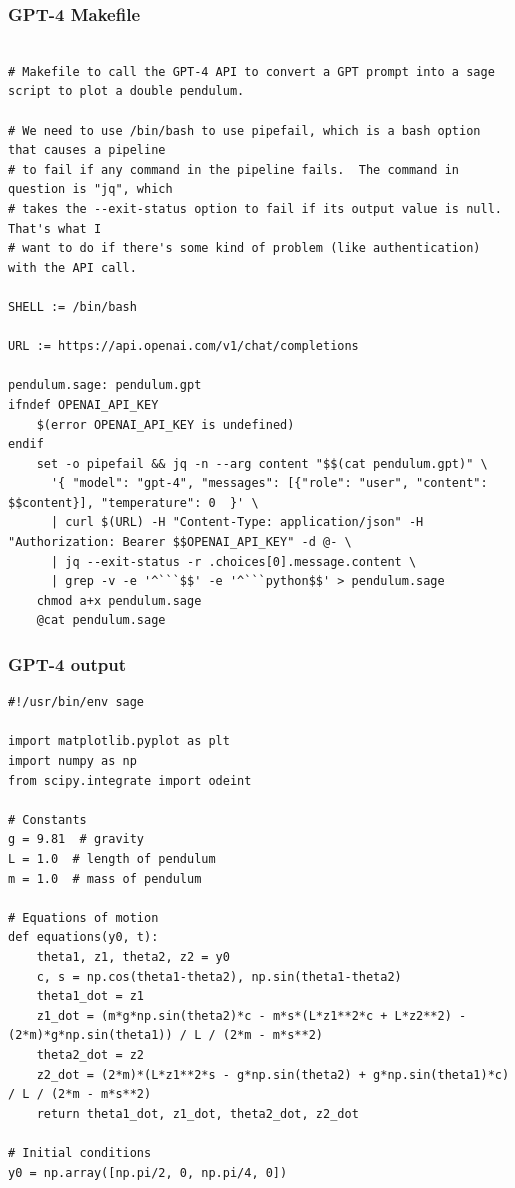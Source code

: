 \documentclass{beamer}
\begin{document}
\begin{frame}[fragile]
\frametitle{GPT-4 Makefile}
\begin{Verbatim}[fontsize=\tiny]

# Makefile to call the GPT-4 API to convert a GPT prompt into a sage script to plot a double pendulum.

# We need to use /bin/bash to use pipefail, which is a bash option that causes a pipeline
# to fail if any command in the pipeline fails.  The command in question is "jq", which
# takes the --exit-status option to fail if its output value is null.  That's what I
# want to do if there's some kind of problem (like authentication) with the API call.

SHELL := /bin/bash

URL := https://api.openai.com/v1/chat/completions

pendulum.sage: pendulum.gpt
ifndef OPENAI_API_KEY
	$(error OPENAI_API_KEY is undefined)
endif
	set -o pipefail && jq -n --arg content "$$(cat pendulum.gpt)" \
	  '{ "model": "gpt-4", "messages": [{"role": "user", "content": $$content}], "temperature": 0  }' \
	  | curl $(URL) -H "Content-Type: application/json" -H "Authorization: Bearer $$OPENAI_API_KEY" -d @- \
	  | jq --exit-status -r .choices[0].message.content \
	  | grep -v -e '^```$$' -e '^```python$$' > pendulum.sage
	chmod a+x pendulum.sage
	@cat pendulum.sage
\end{Verbatim}
\end{frame}

\begin{frame}[fragile]
\frametitle{GPT-4 output}
\begin{Verbatim}[fontsize=\tiny]
#!/usr/bin/env sage

import matplotlib.pyplot as plt
import numpy as np
from scipy.integrate import odeint

# Constants
g = 9.81  # gravity
L = 1.0  # length of pendulum
m = 1.0  # mass of pendulum

# Equations of motion
def equations(y0, t):
    theta1, z1, theta2, z2 = y0
    c, s = np.cos(theta1-theta2), np.sin(theta1-theta2)
    theta1_dot = z1
    z1_dot = (m*g*np.sin(theta2)*c - m*s*(L*z1**2*c + L*z2**2) - (2*m)*g*np.sin(theta1)) / L / (2*m - m*s**2)
    theta2_dot = z2
    z2_dot = (2*m)*(L*z1**2*s - g*np.sin(theta2) + g*np.sin(theta1)*c) / L / (2*m - m*s**2)
    return theta1_dot, z1_dot, theta2_dot, z2_dot

# Initial conditions
y0 = np.array([np.pi/2, 0, np.pi/4, 0])

\end{Verbatim}
\end{frame}
\end{document}
